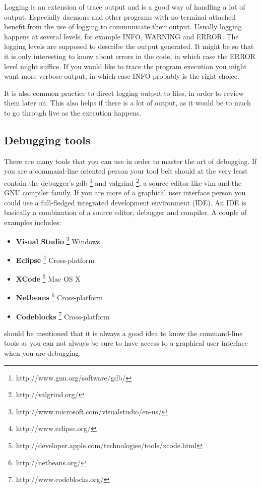 \documentclass[11pt,a4paper,twoside]{article}
\begin{document}
Logging is an extension of trace output and is a good way of handling a lot of
output. Especially daemons and other programs with no terminal attached benefit
from the use of logging to communicate their output. Usually logging happens at
several levels, for example \textsc{INFO}, \textsc{WARNING} and \textsc{ERROR}.
The logging levels are supposed to describe the output generated. It might be
so that it is only interesting to know about errors in the code, in which case
the \textsc{ERROR} level might suffice. If you would like to trace the program
execution you might want more verbose output, in which case \textsc{INFO}
probably is the right choice. 

It is also common practice to direct logging output to files, in order to
review them later on. This also helps if there is a lot of output, as it would
be to much to go through live as the execution happens.

\subsection{Debugging tools}

There are many tools that you can use in order to master the art of debugging.
If you are a command-line oriented person your tool belt should at the very
least contain the debugger's gdb \footnote{http://www.gnu.org/software/gdb/}
and valgrind \footnote{http://valgrind.org/}, a source editor like vim and the
GNU compiler family. If you are more of a graphical user interface person you
could use a full-fledged integrated development environment (IDE). An IDE is
basically a combination of a source editor, debugger and compiler. A couple of
examples includes:

\begin{itemize}
\item \textbf{Visual Studio} \footnote{http://www.microsoft.com/visualstudio/en-us/} Windows
\item \textbf{Eclipse} \footnote{http://www.eclipse.org/} Cross-platform
\item \textbf{XCode} \footnote{http://developer.apple.com/technologies/tools/xcode.html} Mac OS X
\item \textbf{Netbeans} \footnote{http://netbeans.org/} Cross-platform
\item \textbf{Codeblocks} \footnote{http://www.codeblocks.org/} Cross-platform
\end{itemize}


 should be mentioned that it is always a good idea to know the
command-line tools as you can not always be sure to have access to a graphical
user interface when you are debugging.  
\end{document}
